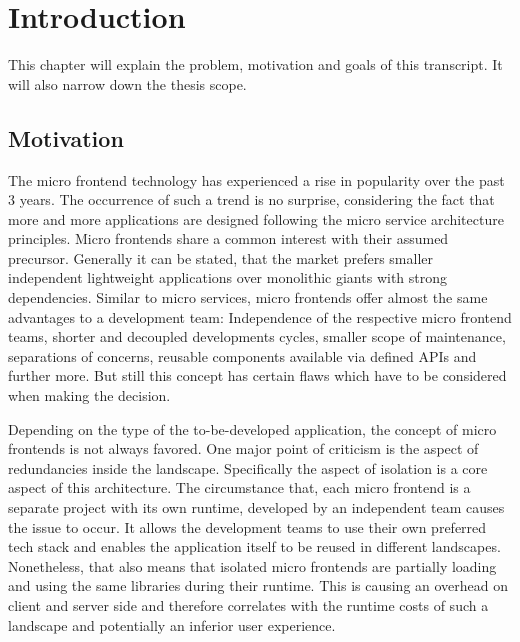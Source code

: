\chapter{Introduction} %
\label{Chapter1}


This chapter will explain the problem, motivation and goals of this transcript. 
It will also narrow down the thesis scope.

\section{Motivation}

The micro frontend technology has experienced a rise in popularity over the past 3 years. The occurrence of such a trend is no surprise, considering the fact that more and more applications are designed following the micro service architecture principles.\cite{google_micro_frontend_trends} 
Micro frontends share a common interest with their assumed precursor. Generally it can be stated, that the market prefers smaller independent lightweight applications over monolithic giants with strong dependencies. Similar to micro services, micro frontends offer almost the same advantages to a development team: Independence of the respective micro frontend teams, shorter and decoupled developments cycles, smaller scope of maintenance, separations of concerns, reusable components available via defined APIs and further more.\cite{advantages_of_mfes} But still this concept has certain flaws which have to be considered when making the decision.\cite{Yang_2019}

Depending on the type of the to-be-developed application, the concept of micro frontends is not always favored. One major point of criticism is the aspect of redundancies inside the landscape. Specifically the aspect of isolation is a core aspect of this architecture. The circumstance that, each micro frontend is a separate project with its own runtime, developed by an independent team causes the issue to occur. It allows the development teams to use their own preferred tech stack and enables the application itself to be reused in different landscapes. Nonetheless, that also means that isolated micro frontends are partially loading and using the same libraries during their runtime. This is causing an overhead on client and server side and therefore correlates with the runtime costs of such a landscape and potentially an inferior user experience.\cite{motivation_benefits_adopting_MFs}\cite{micro_frontends_in_general}

